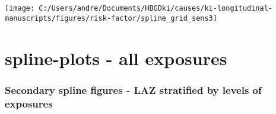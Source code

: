 \documentclass[
  9pt,
]{book}
\begin{document}
\texttt{[image: C:/Users/andre/Documents/HBGDki/causes/ki-longitudinal-manuscripts/figures/risk-factor/spline\_grid\_sens3]}

\hypertarget{rf_splines}{%
\chapter{spline-plots - all exposures}\label{rf_splines}}

\raggedright

\hypertarget{secondary-spline-figures---laz-stratified-by-levels-of-exposures}{%
\subsection{Secondary spline figures - LAZ stratified by levels of exposures}\label{secondary-spline-figures---laz-stratified-by-levels-of-exposures}}
\end{document}
